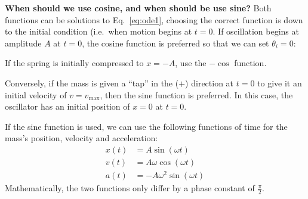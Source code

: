 \begin{common-question}
  \textbf{When should we use cosine, and when should be use sine?} Both
  functions can be solutions to Eq.~\ref{eq:ode1}, choosing the correct
  function is down to the initial condition (i.e.\ when motion begins at $t=0$.
  If oscillation begins at amplitude $A$ at $t=0$, the cosine function is
  preferred so that we can set $\theta_i=0$:
  \begin{center}
  \end{center}
  If the spring is initially compressed to $x=-A$, use the $-\cos$ function.
  
  Conversely, if the mass is given a ``tap'' in the ($+$) direction at $t=0$ to
  give it an initial velocity of $v=v_\text{max}$, then the sine function is
  preferred. In this case, the oscillator has an initial position of $x=0$ at
  $t=0$.
  \begin{center}
  \end{center}
  If the sine function is used, we can use the following functions of time
  for the mass's position, velocity and acceleration:
  \begin{align*}
    x(t)&=A\sin(\omega t)\\
    v(t)&=A\omega\cos(\omega t)\\
    a(t)&=-A\omega^2\sin(\omega t)
  \end{align*}
  Mathematically, the two functions only differ by a phase constant of
  $\frac{\pi}2$.
\end{common-question}

